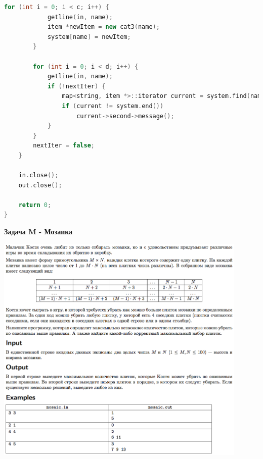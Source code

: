 \documentclass[a4paper,12pt]{article}
\begin{document}
\begin{lstlisting}[language=C++]
        for (int i = 0; i < c; i++) {
            getline(in, name);
            item *newItem = new cat3(name);
            system[name] = newItem;
        }

        for (int i = 0; i < d; i++) {
            getline(in, name);
            if (!nextIter) {
                map<string, item *>::iterator current = system.find(name);
                if (current != system.end())
                    current->second->message();
            }
        }
        nextIter = false;
    }

    in.close();
    out.close();

    return 0;
}
\end{lstlisting}
\newpage
\textbf{{\large Задача M - Мозаика}} \\
\begin{center}
\includegraphics[width=0.9\textwidth]{OC_Northern/OC_Northern_M.png}\\ [1cm]
\end{center}
\newpage
\end{document}

